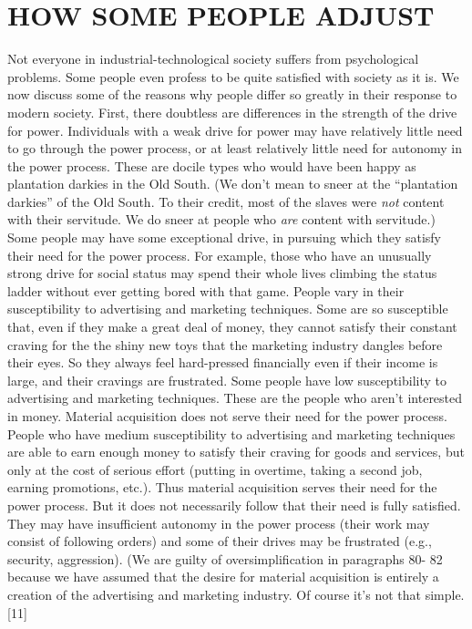 \chapter{HOW SOME PEOPLE ADJUST}

 Not everyone in industrial-technological society suffers from psychological problems. Some people even profess to be quite satisfied with society as it is. We now discuss some of the reasons why people differ so greatly in their response to modern society.
 First, there doubtless are differences in the strength of the drive for power. Individuals with a weak drive for power may have relatively little need to go through the power process, or at least relatively little need for autonomy in the power process. These are docile types who would have been happy as plantation darkies in the Old South. (We don’t mean to sneer at the “plantation darkies” of the Old South. To their credit, most of the slaves were {\em not} content with their servitude. We do sneer at people who {\em are} content with servitude.)
 Some people may have some exceptional drive, in pursuing which they satisfy their need for the power process. For example, those who have an unusually strong drive for social status may spend their whole lives climbing the status ladder without ever getting bored with that game.
 People vary in their susceptibility to advertising and marketing techniques. Some are so susceptible that, even if they make a great deal of money, they cannot satisfy their constant craving for the the shiny new toys that the marketing industry dangles before their eyes. So they always feel hard-pressed financially even if their income is large, and their cravings are frustrated.
 Some people have low susceptibility to advertising and marketing techniques. These are the people who aren’t interested in money. Material acquisition does not serve their need for the power process.
 People who have medium susceptibility to advertising and marketing techniques are able to earn enough money to satisfy their craving for goods and services, but only at the cost of serious effort (putting in overtime, taking a second job, earning promotions, etc.). Thus material acquisition serves their need for the power process. But it does not necessarily follow that their need is fully satisfied. They may have insufficient autonomy in the power process (their work may consist of following orders) and some of their drives may be frustrated (e.g., security, aggression). (We are guilty of oversimplification in paragraphs 80- 82 because we have assumed that the desire for material acquisition is entirely a creation of the advertising and marketing industry. Of course it’s not that simple. [11]
